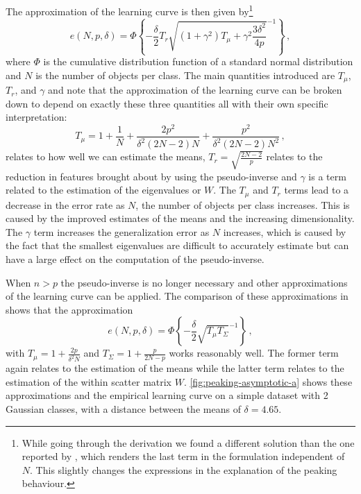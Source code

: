\documentclass[twoside]{memoir}\usepackage[]{graphicx}\usepackage{xcolor}
\renewcommand{\cite}{\citep}
\begin{document}
The approximation of the learning curve is then given by\footnote{While going through the derivation we found a different solution than the one reported by \citet{Raudys1998}, which renders the last term in the formulation independent of $N$. This slightly changes the expressions in the explanation of the peaking behaviour.}
$$e(N,p,\delta) = \Phi \left\{ - \frac{\delta}{2} T_r \sqrt{(1+\gamma^2)T_\mu+\gamma^2 \frac{3 \delta^2}{4 p}}^{-1}\right\} \,,$$
where $\Phi$ is the cumulative distribution function of a standard normal distribution and $N$ is the number of objects per class.  The main quantities introduced are $T_\mu$, $T_r$, and $\gamma$ and \citet{Raudys1998} note that the approximation of the learning curve can be broken down to depend on exactly these three quantities all with their own specific interpretation:
$$T_\mu=1+ \frac{1}{N} + \frac{2 p^2}{\delta^2 (2N-2) N}+\frac{p^2}{\delta^2 (2N-2) N^2}\,,$$
relates to how well we can estimate the means, $T_r=\sqrt{\frac{2 N-2}{p}}$ relates to the reduction in features brought about by using the pseudo-inverse and $\gamma$ is a term related to the estimation of the eigenvalues or $W$.  The $T_\mu$ and $T_r$ terms lead to a decrease in the error rate as $N$, the number of objects per class increases. This is caused by the improved estimates of the means and the increasing dimensionality. The $\gamma$ term increases the generalization error as $N$ increases, which is caused by the fact that the smallest eigenvalues are difficult to accurately estimate but can have a large effect on the computation of the pseudo-inverse.

When $n>p$ the pseudo-inverse is no longer necessary and other approximations of the learning curve can be applied. The comparison of these approximations in \cite{Wyman1990} shows that the approximation
$$
e(N,p,\delta) = \Phi \left\{ - \frac{\delta}{2}  \sqrt{T_\mu T_\Sigma}^{-1}\right\} \,,
$$
with $T_\mu=1+\frac{2 p}{\delta^2 N}$ and $T_\Sigma=1+\frac{p}{2 N - p}$ works reasonably well. The former term again relates to the estimation of the means while the latter term relates to the estimation of the within scatter matrix $W$.  \cref{fig:peaking-asymptotic-a} shows these approximations and the empirical learning curve on a simple dataset with 2 Gaussian classes, with a distance between the means of $\delta=4.65$.
\end{document}
